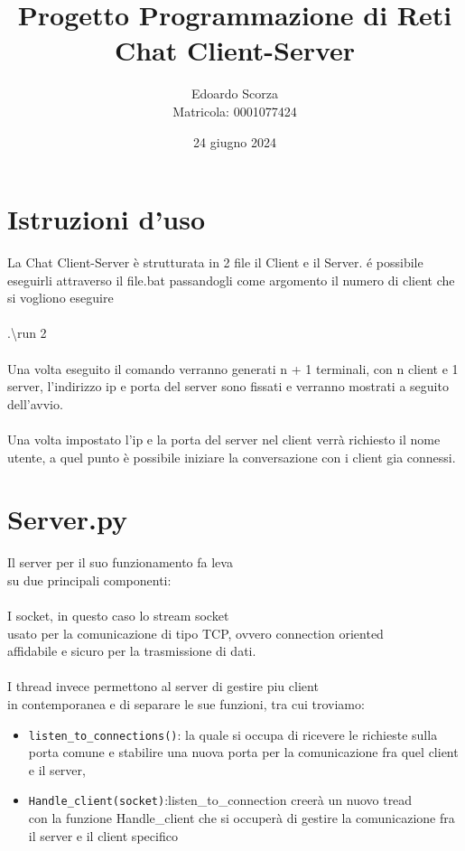 \documentclass[a4paper,12pt]{report}
\title{Progetto Programmazione di Reti 
    \\ Chat Client-Server}
\author{Edoardo Scorza \\ Matricola: 0001077424}
\date{24 giugno 2024}
\begin{document}
\maketitle
\tableofcontents
\chapter*{Istruzioni d'uso}
La Chat Client-Server è strutturata in 2 file il Client e il Server.
é possibile eseguirli attraverso il file.bat passandogli come 
argomento il numero di client che si vogliono eseguire\\\\
.\textbackslash run 2\\\\
Una volta eseguito il comando verranno generati n + 1 terminali,
con n client e 1 server, l'indirizzo ip e porta del server sono fissati
e verranno mostrati a seguito dell'avvio.
\\\\
Una volta impostato l'ip e la porta del server nel client
verrà richiesto il nome utente, a quel punto è possibile iniziare la conversazione
con i client gia connessi.

\chapter*{Server.py}
Il server per il suo funzionamento fa leva\\
su due principali componenti:\\\\
I socket, in questo caso lo stream socket\\
usato per la comunicazione di tipo TCP, ovvero connection oriented\\
affidabile e sicuro per la trasmissione di dati.\\\\
I thread invece permettono al server di gestire piu client\\ in contemporanea
e di separare le sue funzioni, tra cui troviamo:
\begin{itemize}
    \item \texttt{listen\_to\_connections()}: la quale si occupa di ricevere le richieste sulla porta comune e stabilire una nuova porta per la comunicazione fra quel client e il server,
    \item \texttt{Handle\_client(socket)}:listen\_to\_connection creerà un nuovo tread\\ con la funzione Handle\_client che si occuperà di gestire la comunicazione fra il server e il client specifico
\end{itemize}
\end{document}
